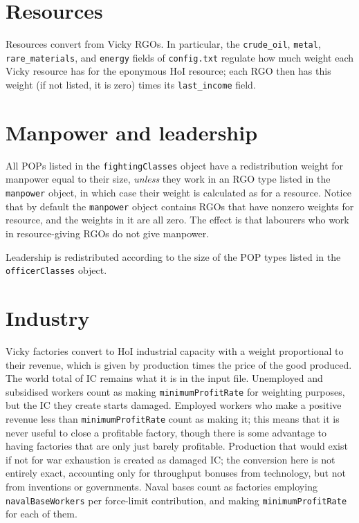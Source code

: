 \documentclass[12pt,ebook,oneside]{book}
\begin{document}
\section{Resources}

Resources convert from Vicky RGOs. In particular, the
\texttt{crude\_oil}, \texttt{metal}, \texttt{rare\_materials}, and
\texttt{energy} fields of \texttt{config.txt} regulate how much weight
each Vicky resource has for the eponymous HoI resource; each RGO then
has this weight (if not listed, it is zero) times its
\texttt{last\_income} field. 

\section{Manpower and leadership}

All POPs listed in the \texttt{fightingClasses} object have a
redistribution weight for manpower equal to their size, \emph{unless}
they work in an RGO type listed in the \texttt{manpower} object, in
which case their weight is calculated as for a resource. Notice that
by default the \texttt{manpower} object contains RGOs that have
nonzero weights for resource, and the weights in it are all zero. The
effect is that labourers who work in resource-giving RGOs do not give
manpower. 

Leadership is redistributed according to the size of the POP types
listed in the \texttt{officerClasses} object. 

\section{Industry} 

Vicky factories convert to HoI industrial capacity with a weight
proportional to their revenue, which is given by production times the
price of the good produced. The world total of IC remains what it
is in the input file. Unemployed and subsidised workers count as
making \texttt{minimumProfitRate} for weighting purposes, but the IC
they create starts damaged. Employed workers who make a positive
revenue less than \texttt{minimumProfitRate} count as making it; this
means that it is never useful to close a profitable factory, though
there is some advantage to having factories that are only just barely
profitable. Production that would exist if not for war exhaustion is
created as damaged IC; the conversion here is not entirely exact,
accounting only for throughput bonuses from technology, but not from
inventions or governments. Naval bases count as factories employing
\texttt{navalBaseWorkers} per force-limit contribution, and making
\texttt{minimumProfitRate} for each of them. 
\end{document}

